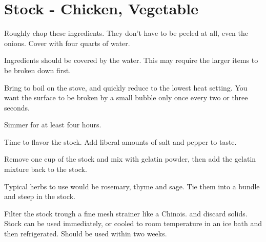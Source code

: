 \section{Stock - Chicken, Vegetable}
\begin{recipe}



Roughly chop these ingredients. They don't have to be peeled at all, even the onions. Cover with four quarts of water.


Ingredients should be covered by the water. This may require the larger items to be broken down first.

Bring to boil on the stove, and quickly reduce to the lowest heat setting. You want the surface to be broken by a small bubble only once every two or three seconds.

Simmer for at least four hours.


Time to flavor the stock. Add liberal amounts of salt and pepper to taste.


Remove one cup of the stock and mix with gelatin powder, then add the gelatin mixture back to the stock.

Typical herbs to use would be rosemary, thyme and sage. Tie them into a bundle and steep in the stock.

Filter the stock trough a fine mesh strainer like a Chinois. and discard solids.
Stock can be used immediately, or cooled to room temperature in an ice bath and then refrigerated. Should be used within two weeks.

\end{recipe}
